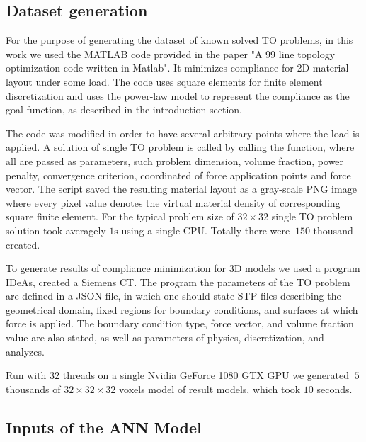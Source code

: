 \subsection{Dataset generation}

For the purpose of generating the dataset of known solved TO problems, in this work we used the MATLAB code provided in the paper "A 99 line topology optimization code written in Matlab"\cite{to_99line}.
It minimizes compliance for 2D material layout under some load.
The code uses square elements for finite element discretization and uses the power-law model to represent the compliance as the goal function, as described in the introduction section.
\medskip

The code was modified in order to have several arbitrary points where the load is applied.
A solution of single TO problem is called by calling the function, where all are passed as parameters, such problem dimension, volume fraction, power penalty, convergence criterion, coordinated of force application points and force vector. 
The script saved the resulting material layout as a gray-scale PNG image where every pixel value denotes the virtual material density of corresponding square finite element.
For the typical problem size of $ 32 \times 32 $ single TO problem solution took averagely $1 \mathrm{s}$ using a single CPU.
Totally there were $~150$ thousand created.
\medskip

To generate results of compliance minimization for 3D models we used a program IDeAs\cite{.}, created a Siemens CT.
The program the parameters of the TO problem are defined in a JSON file, in which one should state STP files describing the geometrical domain, fixed regions for boundary conditions, and surfaces at which force is applied.
The boundary condition type, force vector, and volume fraction value are also stated, as well as parameters of physics, discretization, and analyzes. 
\medskip

Run with $32$ threads on a single Nvidia GeForce 1080 GTX GPU we generated $~5$ thousands of $32 \times 32 \times 32$ voxels model of result models, which took $10$ seconds.
\medskip 



\subsection{Inputs of the ANN Model}

